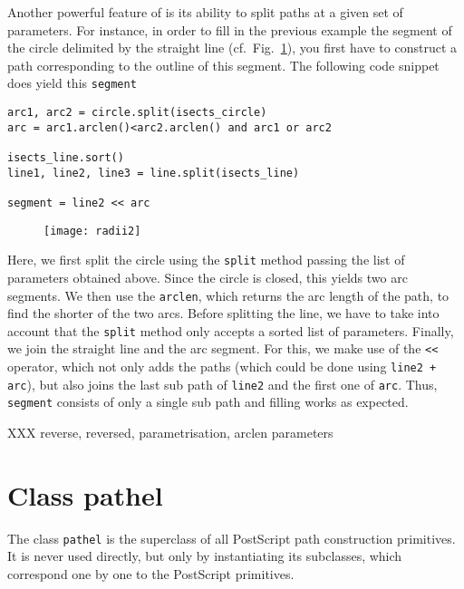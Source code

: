 Another powerful feature of \PyX{} is its ability to split paths at a
given set of parameters. For instance, in order to fill in the
previous example the segment of the circle delimited by the straight
line (cf.\ Fig.~\ref{fig:radii2}), you first have to construct a path
corresponding to the outline of this segment. The following code
snippet does yield this \verb|segment|
\begin{verbatim}
arc1, arc2 = circle.split(isects_circle)
arc = arc1.arclen()<arc2.arclen() and arc1 or arc2

isects_line.sort()
line1, line2, line3 = line.split(isects_line)

segment = line2 << arc
\end{verbatim}
\begin{figure}
\centerline{\texttt{[image: radii2]}}
\label{fig:radii2}
\end{figure}
Here, we first split the circle using the \verb|split| method passing
the list of parameters obtained above. Since the circle is closed,
this yields two arc segments. We then use the \verb|arclen|, which
returns the arc length of the path, to find the shorter of the two
arcs. Before splitting the line, we have to take into account that
the \verb|split| method only accepts a sorted list of parameters.
Finally, we join the straight line and the arc segment. For
this, we make use of the \verb|<<| operator, which not only adds
the paths (which could be done using \verb|line2 + arc|), but also
joins the last sub path of \verb|line2| and the first one of
\verb|arc|. Thus, \verb|segment| consists of only a single sub path
and filling works as expected.

XXX reverse, reversed, parametrisation, arclen parameters




\section{Class pathel}

The class \verb|pathel| is the superclass of all PostScript path
construction primitives. It is never used directly, but only by
instantiating its subclasses, which correspond one by one to the
PostScript primitives.

